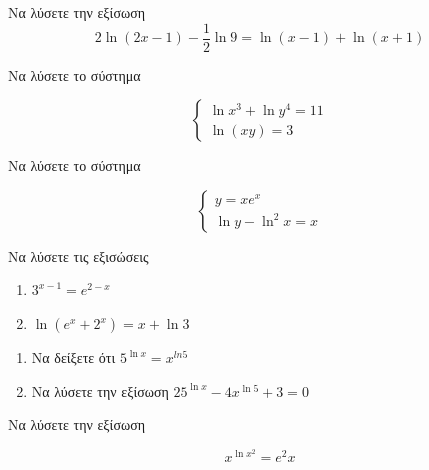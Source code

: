 \documentclass[greek]{beamer}
\begin{document}
\begin{askisi}
  Να λύσετε την εξίσωση
  $$2\ln (2x-1)-\dfrac{1}{2}\ln 9=\ln (x-1)+\ln (x+1)$$


\end{askisi}

\begin{askisi}
  Να λύσετε το σύστημα

  $$\begin{cases}
      \ln x^3+\ln y^4=11 \\
      \ln (xy)=3
    \end{cases}$$


\end{askisi}

\begin{askisi}
  Να λύσετε το σύστημα

  $$\begin{cases}
      y=xe^x \\
      \ln y-\ln^2x=x
    \end{cases}$$


\end{askisi}

\begin{askisi}
  Να λύσετε τις εξισώσεις
  \begin{enumerate}
    \item<1-> $3^{x-1}=e^{2-x}$
    \item<2-> $\ln (e^x+2^x)=x+\ln 3$
  \end{enumerate}


\end{askisi}

\begin{askisi}
  \begin{enumerate}
    \item<1-> Να δείξετε ότι $5^{\ln x}=x^{ln 5}$
    \item<2-> Να λύσετε την εξίσωση $25^{\ln x}-4x^{\ln 5}+3=0$
  \end{enumerate}


\end{askisi}

\begin{askisi}
  Να λύσετε την εξίσωση

  $$x^{\ln x^2}=e^2x$$


\end{askisi}
\end{document}
